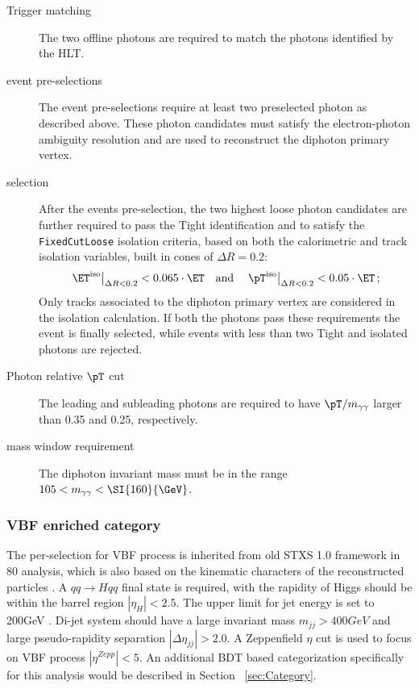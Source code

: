 \begin{description}
	\item[Trigger matching]	The two offline photons are required to match the photons identified by the HLT.
	
	\item[\yy event pre-selections]
	
	The \yy event pre-selections require at least two preselected photon as described above. These photon candidates must satisfy the electron-photon ambiguity resolution and are used to reconstruct the diphoton primary vertex.
	
	\item[\yy selection]
	After the events pre-selection, the two highest \pT loose photon candidates are further required to pass the Tight identification
	and to satisfy the \texttt{FixedCutLoose} isolation criteria, based on both the calorimetric and track
	isolation variables, built in cones of $\Delta R = 0.2$:
	\[
	\left.\ET^\text{iso}\right|_{\Delta R<0.2}<0.065\cdot\ET \quad \text{and}\quad \left.\pT^\text{iso}\right|_{\Delta R<0.2}<0.05\cdot\ET \,;
	\label{eq:FixedCutLoose}
	\]
	Only tracks associated to the diphoton primary vertex are considered in the isolation calculation. If both the photons pass these requirements the event is finally selected, while events with less than two Tight and isolated photons are rejected.
	
	\item[Photon relative $\pT$ cut] The leading and subleading photons are required to have $\pT/\myy$ larger than 0.35 and 0.25, respectively.
	
	\item[\myy mass window requirement] The diphoton invariant mass must be in the range $105<\myy<\SI{160}{\GeV}$.
	
\end{description}

\subsubsection{VBF enriched category}

The per-selection  for VBF process is inherited from old STXS 1.0 framework in 80 \ifb analysis, which is also based on the kinematic characters of the reconstructed particles \cite{ATLAS-CONF-2018-028}. A $qq\to Hqq$ final state is required, with the rapidity of Higgs should be within the barrel region $|\eta_{H}|<2.5$. The upper limit for jet energy is set to 200GeV . Di-jet system should have a large invariant mass $m_{jj}>400GeV$ and large pseudo-rapidity separation $|\Delta \eta_{jj}|>2.0$. A Zeppenfield $\eta$  cut is used to focus on VBF process $|\eta^{Zepp}|<5$. An additional BDT based categorization specifically for this analysis would be described in Section ~\ref{sec:Category}. 



